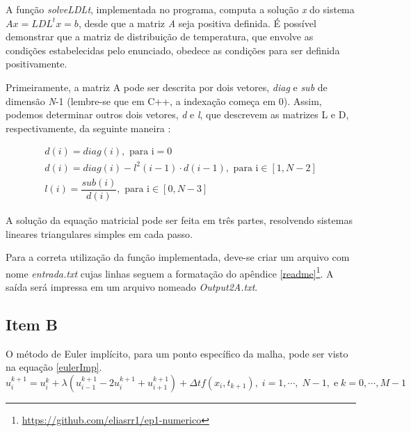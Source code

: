 \documentclass[12pt]{article}
\begin{document}
\begin{spacing}{1.5}
A função \textit{solveLDLt}, implementada no programa, computa a solução \textit{x} do sistema $Ax = LDL^{t}x = b$, desde que a matriz \textit{A} seja positiva definida. É possível demonstrar \supercite{heat} que a matriz de distribuição de temperatura, que envolve as condições estabelecidas pelo enunciado, obedece as condições para ser definida positivamente.

Primeiramente, a matriz A pode ser descrita por dois vetores, \textit{diag} e \textit{sub} de dimensão \textit{N}-1 (lembre-se que em C++, a indexação começa em 0). Assim, podemos determinar outros dois vetores, \textit{d} e \textit{l}, que descrevem as matrizes L e D, respectivamente, da seguinte maneira \supercite{cholesky}:

\begin{gather}
    d(i) = diag(i), \text{ para i}= 0 \\
    d(i) = diag(i) - l^2(i-1)\cdot d(i-1), \text{ para i} \in [1, \textit{N}-2] \\
    l(i) = \dfrac{sub(i)}{d(i)}, \text{ para i} \in [0, \textit{N}-3]
\end{gather}

A solução da equação matricial pode ser feita em três partes, resolvendo sistemas lineares triangulares simples em cada passo. 

Para a correta utilização da função implementada, deve-se criar um arquivo com nome \textit{entrada.txt} cujas linhas seguem a formatação do apêndice \ref{readme}\footnote{\url{https://github.com/eliasrr1/ep1-numerico}}. A saída será impressa em um arquivo nomeado \textit{Output2A.txt}.

\subsection{Item B}

O método de Euler implícito, para um ponto específico da malha, pode ser visto na equação \eqref{eulerImp}.
\setlength{\abovedisplayskip}{0.2cm}
\setlength{\belowdisplayskip}{0.2cm}
\begin{equation} \label{eulerImp}
u_{i}^{k+1} = u_i^k + \lambda(u^{k+1}_{i-1} - 2u^{k+1}_{i} + u_{i+1}^{k+1}) + \Delta t f(x_{i},t_{k+1}), \; i = 1,\cdots ,\; \textit{N}-1, \;\text{e} \; k = 0, \cdots, \textit{M}-1\;
\end{equation}


\end{spacing}
\end{document}
